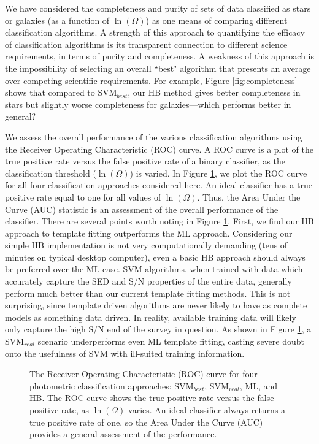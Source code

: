\documentclass[12pt,preprint]{aastex}
\begin{document}
We have considered the completeness and purity of sets of data
classified as stars or galaxies (as a function of $\ln(\Omega)$) as
one means of comparing different classification algorithms.  A
strength of this approach to quantifying the efficacy of
classification algorithms is its transparent connection to different
science requirements, in terms of purity and completeness.  A weakness
of this approach is the impossibility of selecting an overall ``best"
algorithm that presents an average over competing scientific
requirements.  For example, Figure \ref{fig:completeness} shows that
compared to SVM$_{best}$, our HB method gives better completeness in
stars but slightly worse completeness for galaxies---which performs
better in general?

We assess the overall performance of the various classification
algorithms using the Receiver Operating Characteristic (ROC) curve.  A
ROC curve is a plot of the true positive rate versus the false
positive rate of a binary classifier, as the classification threshold
($\ln(\Omega)$) is varied.  In Figure \ref{fig:roc}, we plot the ROC
curve for all four classification approaches considered here.  An
ideal classifier has a true positive rate equal to one for all values
of $\ln(\Omega)$.  Thus, the Area Under the Curve (AUC) statistic is
an assessment of the overall performance of the classifier.  There are
several points worth noting in Figure \ref{fig:roc}.  First, we find our HB
approach to template fitting outperforms the ML approach.
Considering our simple HB implementation is not very computationally
demanding (tens of minutes on typical desktop computer), even a basic
HB approach should always be preferred over the ML case.  SVM
algorithms, when trained with data which accurately capture the SED
and S/N properties of the entire data, generally perform much better
than our current template fitting methods.  This is not surprising,
since template driven algorithms are never likely to have as complete
models as something data driven.  In reality, available training data will 
likely only capture the high
S/N end of the survey in question.  As shown in Figure \ref{fig:roc},
a SVM$_{real}$ scenario underperforms even ML template fitting,
casting severe doubt onto the usefulness of SVM with ill-suited
training information.


\begin{figure}
\centering
\caption{The Receiver Operating Characteristic (ROC) curve for four photometric 
classification approaches: SVM$_{best}$, SVM$_{real}$, ML, and HB.  The ROC curve 
shows the true positive rate versus the false positive rate, as $\ln(\Omega)$ varies.  An ideal classifier 
always returns a true positive rate of one, so the Area Under the Curve (AUC) provides a 
general assessment of the performance.}
\label{fig:roc}
\end{figure}
\end{document}
